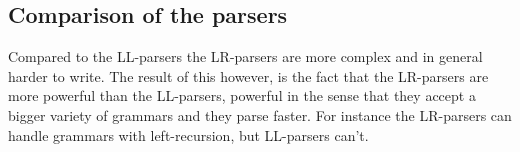 \subsection{Comparison of the parsers}
Compared to the LL-parsers the LR-parsers are more complex and in general harder to write. The result of this however, is the fact that the LR-parsers are more powerful than the LL-parsers, powerful in the sense that they accept a bigger variety of grammars and they parse faster. For instance the LR-parsers can handle grammars with left-recursion, but LL-parsers can't.            
